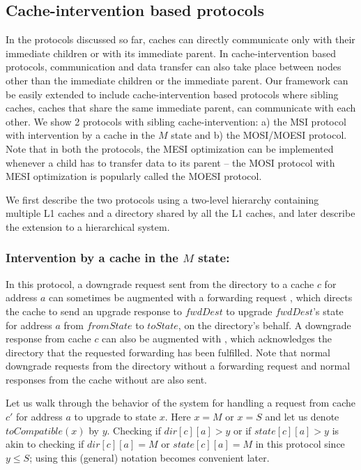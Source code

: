 \subsection{Cache-intervention based protocols}
In the protocols discussed so far, caches can directly communicate only with
their immediate children or with its immediate parent. In cache-intervention
based protocols, communication and data transfer can also take place between
nodes other than the immediate children or the immediate parent. Our framework
can be easily extended to include cache-intervention based protocols where
sibling caches, \ie caches that share the same immediate parent, can communicate
with each other. We show 2 protocols with sibling cache-intervention: a) the MSI
protocol with intervention by a cache in the $M$ state and b) the MOSI/MOESI
protocol. Note that in both the protocols, the MESI optimization can be
implemented whenever a child has to transfer data to its parent -- the MOSI
protocol with MESI optimization is popularly called the MOESI protocol.

We first describe the two protocols using a two-level hierarchy containing
multiple L1 caches and a directory shared by all the L1 caches, and later
describe the extension to a hierarchical system.

\subsubsection{Intervention by a cache in the $M$ state:}
\label{sec:m-only}

In this protocol, a downgrade request sent from the directory to a cache $c$ for
address $a$ can sometimes be augmented with a forwarding request
, which directs the cache to send an upgrade
response to $fwdDest$ to upgrade $fwdDest$'s state for address $a$ from
$fromState$ to $toState$, on the directory's behalf. A downgrade response from
cache $c$ can also be augmented with \FwdAck{}, which acknowledges the directory
that the requested forwarding has been fulfilled.  Note that normal downgrade
requests from the directory without a forwarding request and normal responses
from the cache without \FwdAck{} are also sent.

Let us walk through the behavior of the system for handling a request from cache
$c'$ for address $a$ to upgrade to state $x$. Here $x = M$ or $x = S$ and let us
denote $toCompatible(x)$ by $y$. Checking if $dir[c][a] > y$ or if $state[c][a]
> y$ is akin to checking if $dir[c][a] = M$ or $state[c][a] = M$ in this
protocol since $y \le S$; using this (general) notation becomes convenient
later.

